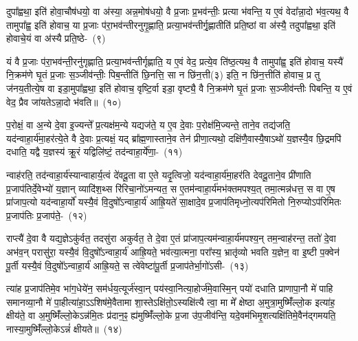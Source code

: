 दुपा᳚ह्वथा॒ इति॑ होवा॒चौष॑धयो॒ वा अ॑स्या॒ अन्न॒मोष॑धयो॒ वै प्र॒जाः प्र॒भव॑न्तीः॒ प्रत्या भ॑वन्ति॒ य ए॒वं वेदा᳚न्ना॒दो भ॑व॒त्यथ॒ वै तामुपा᳚ह्व॒ इति॑ होवाच॒ या प्र॒जाः प॑रा॒भव॑न्तीरनुगृ॒ह्णाति॒ प्रत्या॒भव॑न्तीर्गृ॒ह्णातीति॑ प्रति॒ष्ठां वा अ॑स्यै॒ तदुपा᳚ह्वथा॒ इति॑ होवाचे॒यं वा अ॑स्यै प्रति॒ष्ठे-~(९)\ip

यं वै प्र॒जाः प॑रा॒भव॑न्ती॒रनु॑गृह्णाति॒ प्रत्या॒भव॑न्तीर्गृह्णाति॒ य ए॒वं वेद॒ प्रत्ये॒व ति॑ष्ठ॒त्यथ॒ वै तामुपा᳚ह्व॒ इति॑ होवाच॒ यस्यै॑ नि॒क्रम॑णे घृ॒तं प्र॒जाः स॒ञ्जीव॑न्तीः॒ पिब॒न्तीति॑ छि॒नत्ति॒ सा न छि॑न॒त्ती(३) इति॒ न छि॑न॒त्तीति॑ होवाच॒ प्र तु ज॑नय॒तीत्ये॒ष वा इडा॒मुपा᳚ह्वथा॒ इति॑ होवाच॒ वृष्टि॒र्वा इडा॒ वृष्ट्यै॒ वै नि॒क्रम॑णे घृ॒तं प्र॒जाः स॒ञ्जीव॑न्तीः पिबन्ति॒ य ए॒वं वेद॒ प्रैव जा॑यते\-ऽन्ना॒दो भ॑वति॥~(१०)\ip

{\anuvakamend[{गौर्वा अ॑स्यै॒ तत् प्र॑ति॒ष्ठा\-ऽह्व॑था॒ इति॑ विꣳश॒तिश्च॑}]}

प॒रोक्षं॒ वा अ॒न्ये दे॒वा इ॒ज्यन्ते᳚ प्र॒त्यक्ष॑म॒न्ये यद्यज॑ते॒ य ए॒व दे॒वाः प॒रोक्ष॑मि॒ज्यन्ते॒ ताने॒व तद्य॑जति॒ यद॑न्वाहा॒र्य॑मा॒हर॑त्ये॒ते वै दे॒वाः प्र॒त्यक्षं॒ यद् ब्रा᳚ह्म॒णास्ताने॒व तेन॑ प्रीणा॒त्यथो॒ दक्षि॑णै॒वास्यै॒षा\-ऽथो॑ य॒ज्ञस्यै॒व छि॒द्रमपि॑ दधाति॒ यद्वै य॒ज्ञस्य॑ क्रू॒रं यद्विलि॑ष्टं॒ तद॑न्वाहा॒र्ये॑णा॒-~(११)\ip

न्वाह॑रति॒ तद॑न्वाहा॒र्य॑स्यान्वाहार्य॒त्वं दे॑वदू॒ता वा ए॒ते यदृ॒त्विजो॒ यद॑न्वाहा॒र्य॑मा॒हर॑ति देवदू॒ताने॒व प्री॑णाति प्र॒जा\-प॑तिर्दे॒वेभ्यो॑ य॒ज्ञान् व्यादि॑श॒थ्स रि॑रिचा॒नो॑\-ऽमन्यत॒ स ए॒तम॑न्वाहा॒र्य॑मभ॑क्तमपश्य॒त् तमा॒त्मन्न॑धत्त॒ स वा ए॒ष प्रा॑जाप॒त्यो यद॑न्वाहा॒र्यो॑ यस्यै॒वं वि॒दुषो᳚\-ऽन्वाहा॒र्य॑ आह्रि॒यते॑ सा॒क्षादे॒व प्र॒जा\-प॑तिमृध्नो॒त्यप॑रिमितो नि॒रुप्यो\-ऽप॑रिमितः प्र॒जा\-प॑तिः प्र॒जा\-प॑ते॒-~(१२)\ip

राप्त्यै॑ दे॒वा वै यद्य॒ज्ञे\-ऽकु॑र्वत॒ तदसु॑रा अकुर्वत॒ ते दे॒वा ए॒तं प्रा॑जाप॒त्यम॑न्वाहा॒र्य॑मपश्य॒न् तम॒न्वाह॑रन्त॒ ततो॑ दे॒वा अभ॑व॒न् परासु॑रा॒ यस्यै॒वं वि॒दुषो᳚\-ऽन्वाहा॒र्य॑ आह्रि॒यते॒ भव॑त्या॒त्मना॒ परा᳚स्य॒ भ्रातृ॑व्यो भवति य॒ज्ञेन॒ वा इ॒ष्टी प॒क्वेन॑ पू॒र्ती यस्यै॒वं वि॒दुषो᳚\-ऽन्वाहा॒र्य॑ आह्रि॒यते॒ स त्वे॑वेष्टा॑पू॒र्ती प्र॒जा\-प॑तेर्भा॒गो॑\-\mbox{\-ऽसी-~(१३)\ip}

त्या॑ह प्र॒जा\-प॑तिमे॒व भा॑ग॒धेये॑न॒ सम॑र्धय॒त्यूर्ज॑स्वा॒न् पय॑स्वा॒नित्या॒होर्ज॑मे॒वास्मि॒न् पयो॑ दधाति प्राणापा॒नौ मे॑ पाहि समानव्या॒नौ मे॑ पा॒हीत्या॑हा॒\-ऽऽ\-शिष॑मे॒वैतामा शा॒स्ते\-ऽक्षि॑तो॒\-ऽस्यक्षि॑त्यै त्वा॒ मा मे᳚ क्षेष्ठा अ॒मुत्रा॒मुष्मिँ॑ल्लो॒क इत्या॑ह॒ क्षीय॑ते॒ वा अ॒मुष्मिँ॑ल्लो॒के\-ऽन्न॑मि॒तः प्र॑दान॒ꣴ॒ ह्य॑मुष्मिँ॑ल्लो॒के प्र॒जा उ॑प॒जीव॑न्ति॒ यदे॒वम॑भिमृ॒शत्यक्षि॑तिमे॒वैन॑द्गमयति॒ नास्या॒मुष्मिँ॑ल्लो॒के\-ऽन्नं॑ क्षीयते॥~(१४)\ip

